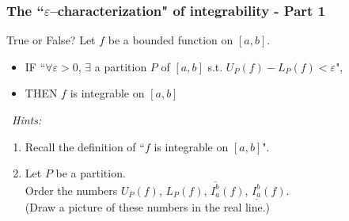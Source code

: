 \documentclass[14pt]{beamer}
\newcommand{\e}{\varepsilon}
\newcommand{\setsize}[1]{\fontsize{#1}{#1}\selectfont} %
\newcommand{\lifab}{\underline{I_a^b}(f)}
\newcommand{\uifab}{\overline{I_a^b}(f)}
\begin{document}
	\begin{frame}[t]
		\setsize{11}
		\frametitle{The ``$\e$--characterization" of integrability - Part 1}

		\begin{block}{\setsize{11} True or False?}
			Let $f$ be a bounded function on $[a,b]$.
			\begin{itemize}
				\item IF \hfill ``$\forall \varepsilon>0$, $\exists$ a partition $P$ of
					$[a,b]$ s.t. ${\displaystyle U_P(f) - L_P(f) < \varepsilon}$",

				\item THEN \; $f$ is integrable on $[a,b]$
			\end{itemize}
		\end{block}

		\
 \emph{Hints:}
		\begin{enumerate}
			\item Recall the definition of ``$f$ is integrable on $[a,b]$".

			\item Let $P$ be a partition. \\ Order the numbers
				${\displaystyle U_P(f)}$, ${\displaystyle L_P(f)}$,
				${\displaystyle \uifab}$, ${\displaystyle \lifab}$. \\ (Draw a picture of
				these numbers in the real line.)
		\end{enumerate}
	\end{frame}
\end{document}
